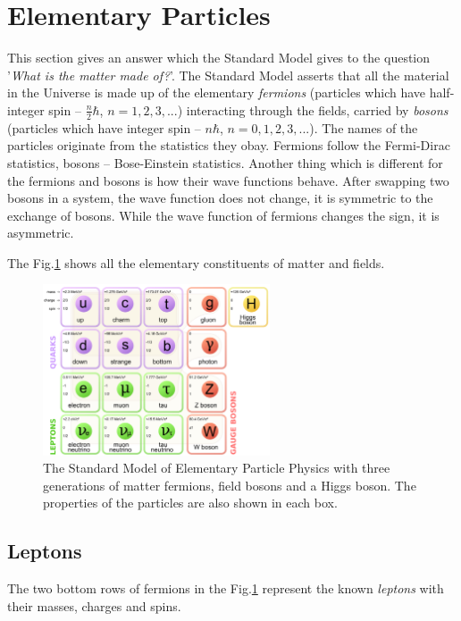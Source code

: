 \section{Elementary Particles}

This section gives an answer which the Standard Model gives to the question '\textit{What is the matter made of?}'.
The Standard Model asserts that all the material in the Universe is made up of the elementary \textit{fermions} (particles
which have half-integer spin -- $\frac{n}{2}\hbar$, $n = 1, 2, 3, ...$) interacting through the fields, carried 
by \textit{bosons} (particles which have integer spin -- $n\hbar$, $n = 0, 1, 2, 3, ...$). The names of the particles 
originate from the statistics they obay. Fermions follow the Fermi-Dirac statistics, bosons -- Bose-Einstein statistics.
Another thing which is different for the fermions and bosons is how their wave functions behave. After swapping two
bosons in a system, the wave function does not change, it is symmetric to the exchange of bosons. While the wave function
of fermions changes the sign, it is asymmetric.

The Fig.\ref{fig:SM_Particles} shows all the elementary constituents of matter and fields.
\begin{figure}[t]
  \centering
  \includegraphics[width=0.6\textwidth]{01_Theory_SM/plots/Standard_Model_of_Elementary_Particles.png}
  \caption{The Standard Model of Elementary Particle Physics with three generations of matter fermions, field bosons and a Higgs boson. 
  The properties of the particles are also shown in each box.}
  \label{fig:SM_Particles}
\end{figure}


\subsection{Leptons}

The two bottom rows of fermions in the Fig.\ref{fig:SM_Particles} represent the known \textit{leptons} with their masses, charges
and spins. 

